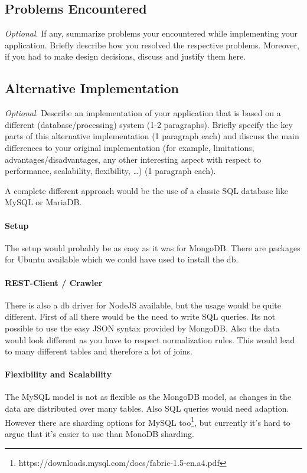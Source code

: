 \subsection{Problems Encountered}

\emph{Optional}. If any, summarize problems your encountered while implementing
your application. Briefly describe how you resolved the respective problems.
Moreover, if you had to make design decisions, discuss and justify them here.

\subsection{Alternative Implementation}

\emph{Optional}. Describe an implementation of your application that is based on
a different (database/processing) system (1-2 paragraphs). Briefly specify the
key parts of this alternative implementation (1 paragraph each) and discuss the
main differences to your original implementation (for example, limitations,
advantages/disadvantages, any other interesting aspect with respect to
performance, scalability, flexibility, \ldots) (1 paragraph each).

A complete different approach would be the use of a classic SQL database like MySQL or MariaDB.

\paragraph{Setup}
The setup would probably be as easy as it was for MongoDB. There are packages for Ubuntu available which we could have used to install the db.

\paragraph{REST-Client / Crawler}
There is also a db driver for NodeJS available, but the usage would be quite different. First of all there would be the need to write SQL queries. Its not possible to use the easy JSON syntax provided by MongoDB. Also the data would look different as you have to respect normalization rules. This would lead to many different tables and therefore a lot of joins.

\paragraph{Flexibility and Scalability}
The MySQL model is not as flexible as the MongoDB model, as changes in the data are distributed over many tables. Also SQL queries would need adaption. However there are sharding options for MySQL too\footnote{https://downloads.mysql.com/docs/fabric-1.5-en.a4.pdf}, but currently it's hard to argue that it's easier to use than MonoDB sharding. 
